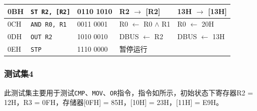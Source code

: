\documentclass[lang=cn,11pt,a4paper,cite=authornum]{paper}
\begin{document}
\begin{table}[!htbp]
\begin{tabular}{|l|l|l|l|l|}
        0BH & \texttt{ST R2, [R2]} & 0110 1010  &  R2 $\rightarrow$ [R2] & 13H $\rightarrow$ [13H] \\ \hline 
        0CH & \texttt{AND R0, R1} & 0011 0001  &  R0 $\leftarrow$ R0 $\wedge$ R1 & R0 $\leftarrow$ 20H \\ \hline 
        0DH & \texttt{OUT R2} & 1010 0010  &  DBUS $\leftarrow$ R2 & DBUS $\leftarrow$ 13H \\ \hline 
        0EH & \texttt{STP} & 1110 0000  &  暂停运行 &  \\ \hline
    \end{tabular}
\end{table}

\subsubsection{测试集4}

此测试集主要用于测试\texttt{CMP}、\texttt{MOV}、\texttt{OR}指令，指令如所示，初始状态下寄存器R2 = 12H，R3 = 0FH，存储器[0FH] = 85H，[10H] = 23H，[11H] = E9H。
\end{document}
